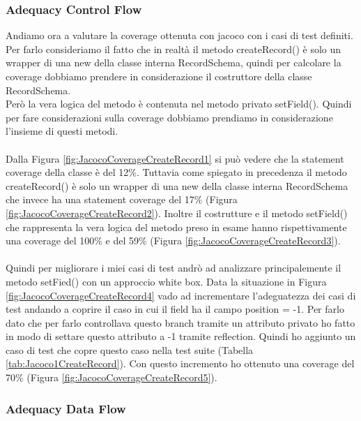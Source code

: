 \documentclass[12pt, a4paper]{article}
\begin{document}
\subsubsection{Adequacy Control Flow}

Andiamo ora a valutare la coverage ottenuta con jacoco con i casi di test definiti. Per farlo consideriamo il fatto
che in realtà il metodo createRecord() è solo un wrapper di una new della classe interna RecordSchema, quindi per calcolare
la coverage dobbiamo prendere in considerazione il costruttore della classe RecordSchema. \\ Però la vera logica del metodo
è contenuta nel metodo privato setField(). Quindi per fare considerazioni sulla coverage dobbiamo prendiamo in considerazione 
l'insieme di questi metodi. \\ \\
Dalla Figura \ref{fig:JacocoCoverageCreateRecord1} si può vedere che la statement coverage della classe è del 12\%. Tuttavia come 
spiegato in precedenza il metodo createRecord() è solo un wrapper di una new della classe interna RecordSchema che invece ha una
statement coverage del 17\% (Figura \ref{fig:JacocoCoverageCreateRecord2}). Inoltre il costrutture e il metodo setField() 
che rappresenta la vera logica del metodo preso in esame hanno rispettivamente una coverage del 100\% e del 59\% 
(Figura \ref{fig:JacocoCoverageCreateRecord3}). \\ \\
Quindi per migliorare i miei casi di test andrò ad analizzare principalemente il metodo setFied() con un approccio white box.
Data la situazione in Figura \ref{fig:JacocoCoverageCreateRecord4} vado ad incrementare l'adeguatezza dei casi di test
andando a coprire il caso in cui il field ha il campo position = -1. Per farlo dato che per farlo controllava questo branch 
tramite un attributo privato ho fatto in modo di settare questo attributo a -1 tramite reflection.
Quindi ho aggiunto un caso di test che copre questo caso nella test suite (Tabella \ref{tab:Jacoco1CreateRecord}).
Con questo incremento ho ottenuto una coverage del 70\% (Figura \ref{fig:JacocoCoverageCreateRecord5}).


\subsubsection{Adequacy Data Flow}
\end{document}
